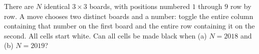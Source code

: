 There are $N$ identical $3\times3$ boards, with positions numbered $1$ through $9$ row by row. A move chooses two distinct boards and a number: toggle the entire column containing that number on the first board and the entire row containing it on the second. All cells start white. Can all cells be made black when (a) $N=2018$ and (b) $N=2019$?
